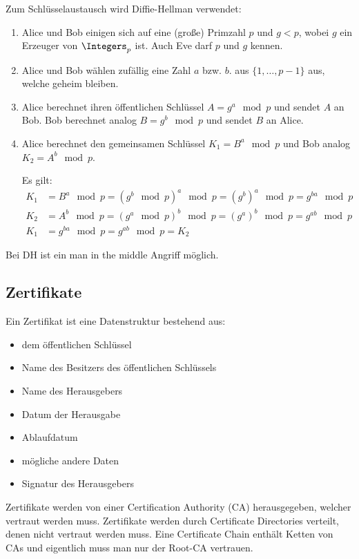 Zum Schlüsselaustausch wird Diffie-Hellman verwendet:
\begin{enumerate}
  \item Alice und Bob einigen sich auf eine (große) Primzahl $p$ und $g < p$, wobei $g$
    ein Erzeuger von $\Integers_p$ ist.
    Auch Eve darf $p$ und $g$ kennen.
  \item Alice und Bob wählen zufällig eine Zahl $a$ bzw. $b$. aus $\{1, \ldots, p-1\}$
    aus, welche geheim bleiben.
  \item Alice berechnet ihren öffentlichen Schlüssel $A = g^a \mod p$ und sendet $A$ an
    Bob.
    Bob berechnet analog $B = g^b \mod p$ und sendet $B$ an Alice.
  \item Alice berechnet den gemeinsamen Schlüssel $K_1 = B^a \mod p$
    und Bob analog $K_2 = A^b \mod p$.

    Es gilt:
    \begin{align*}
      K_1 & = B^a \mod p = (g^b \mod p)^a \mod p = (g^b)^a \mod p = g^{ba} \mod p\\
      K_2 & = A^b \mod p = (g^a \mod p)^b \mod p = (g^a)^b \mod p = g^{ab} \mod p\\
      K_1 & = g^{ba} \mod p = g^{ab} \mod p = K_2
    \end{align*}
\end{enumerate}
Bei DH ist ein man in the middle Angriff möglich.

\subsection{Zertifikate}%
\label{sub:zertifikate}

Ein Zertifikat ist eine Datenstruktur bestehend aus:
\begin{itemize}
  \item dem öffentlichen Schlüssel
  \item Name des Besitzers des öffentlichen Schlüssels
  \item Name des Herausgebers
  \item Datum der Herausgabe
  \item Ablaufdatum
  \item mögliche andere Daten
  \item Signatur des Herausgebers
\end{itemize}

Zertifikate werden von einer Certification Authority (CA) herausgegeben, welcher vertraut
werden muss.
Zertifikate werden durch Certificate Directories verteilt, denen nicht vertraut werden
muss.
Eine Certificate Chain enthält Ketten von CAs und eigentlich muss man nur der Root-CA
vertrauen.
